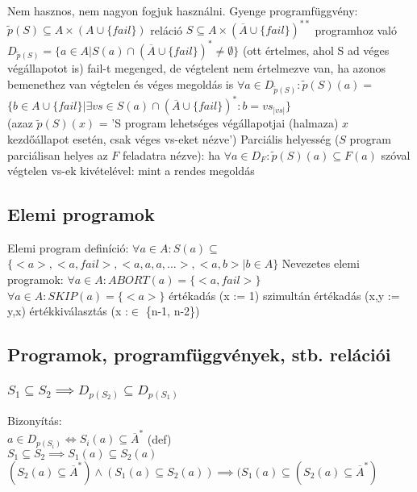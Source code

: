\documentclass[12pt,a4paper]{article}
\begin{document}
\begin{outline}
	\1 Nem hasznos, nem nagyon fogjuk használni.
	\1 Gyenge programfüggvény:
		\2 $\widetilde{p}(S) \subseteq A \times (A \cup \{fail\})$ reláció
		\2 $S \subseteq A \times (\overline{A} \cup \{fail\})^{**}$ programhoz való
		\2 $D_{\widetilde{p}(S)} = \{ a \in A | S(a) \cap (\overline{A} \cup \{fail\})^* \ne \emptyset \}$
		(ott értelmes, ahol S ad véges végállapotot is)
			\3 fail-t megenged, de végtelent nem
			\3 értelmezve van, ha azonos bemenethez van végtelen és véges megoldás is
		\2 $\forall a \in D_{\widetilde{p}(S)}: \widetilde{p}(S)(a) =$\\
		$\{b \in A \cup \{fail\} | \exists vs \in S(a) \cap (\overline{A} \cup \{fail\})^*: b=vs_{|vs|}\}$ \\
		(azaz $\widetilde{p}(S)(x)$ = 'S program lehetséges végállapotjai (halmaza) $x$ kezdőállapot esetén, csak véges vs-eket nézve')
	\1 Parciális helyesség ($S$ program parciálisan helyes az $F$ feladatra nézve):
		\2 ha $\forall a \in D_F: \widetilde{p}(S)(a) \subseteq F(a)$
		\2 szóval végtelen vs-ek kivételével: mint a rendes megoldás
\end{outline}

\subsection{Elemi programok}

\begin{outline}
	\1 Elemi program definíció: $\forall a \in A: S(a) \subseteq$ \\
	$\{ <a>, <a,fail>, <a,a,a,...>, <a,b> | b \in A \}$
	\1 Nevezetes elemi programok:
		\2 $\forall a \in A: ABORT(a) = \{<a, fail>\}$
		\2 $\forall a \in A: SKIP(a) = \{<a>\}$
		\2 értékadás (x := 1)
		\2 szimultán értékadás (x,y := y,x)
		\2 értékkiválasztás (x :$\in$ \{n-1, n-2\})
\end{outline}

\pagebreak

\subsection{Programok, programfüggvények, stb. relációi}

\subsubsection{$S_1 \subseteq S_2 \implies D_{p(S_2)} \subseteq D_{p(S_1)}$}

Bizonyítás: \\
$a \in D_{p(S_i)} \Leftrightarrow S_i(a) \subseteq \overline{A}^*$ (def) \\
$S_1 \subseteq S_2 \implies S_1(a) \subseteq S_2(a)$ \\
$(S_2(a) \subseteq \overline{A}^*) \wedge (S_1(a) \subseteq S_2(a))
\implies (S_1(a) \subseteq (S_2(a) \subseteq \overline{A}^*)$
\end{document}

